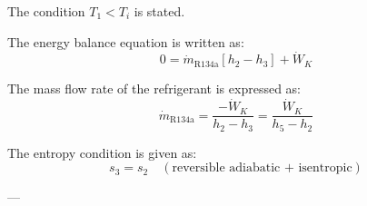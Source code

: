 The condition \(T_1 < T_i\) is stated.  

The energy balance equation is written as:  
\[
0 = \dot{m}_{\text{R134a}} \left[ h_2 - h_3 \right] + \dot{W}_K
\]

The mass flow rate of the refrigerant is expressed as:  
\[
\dot{m}_{\text{R134a}} = \frac{-\dot{W}_K}{h_2 - h_3} = \frac{\dot{W}_K}{h_5 - h_2}
\]

The entropy condition is given as:  
\[
s_3 = s_2 \quad (\text{reversible adiabatic + isentropic})
\]

---